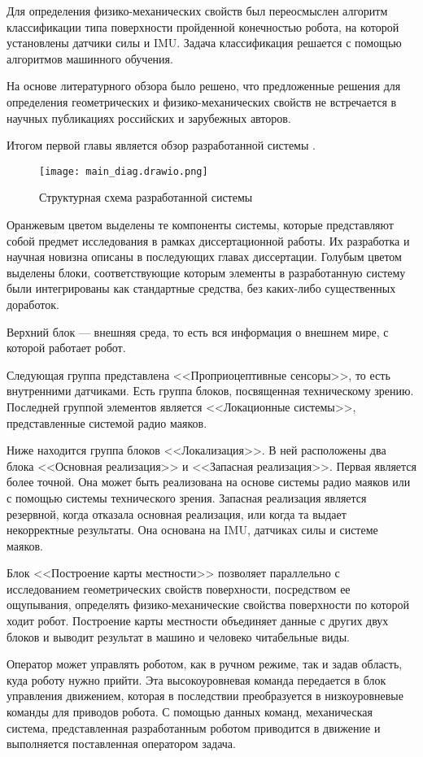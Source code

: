Для определения физико-механических свойств был переосмыслен алгоритм классификации типа поверхности пройденной конечностью робота, на которой установлены датчики силы и IMU. Задача классификация решается с помощью алгоритмов машинного обучения.  

На основе литературного обзора было решено, что предложенные решения для определения геометрических и физико-механических свойств не встречается в научных публикациях российских и зарубежных авторов.

Итогом первой главы является обзор разработанной системы .
\begin{figure}[ht!]
    \centering\texttt{[image: main\_diag.drawio.png]}
    \caption{Структурная схема разработанной системы}
    \label{fig:diag_system.png}
\end{figure}

Оранжевым цветом выделены те компоненты системы, которые представляют собой предмет исследования в рамках диссертационной работы. Их разработка и научная новизна описаны в последующих главах диссертации. Голубым цветом выделены блоки, соответствующие которым элементы в разработанную систему были интегрированы как стандартные средства,   без каких-либо существенных доработок.

Верхний блок --- внешняя среда, то есть вся информация о внешнем мире, с которой работает робот.

Следующая группа представлена <<Проприоцептивные сенсоры>>, то есть внутренними датчиками. Есть группа блоков, посвященная техническому зрению. Последней группой элементов является <<Локационные системы>>, представленные системой радио маяков. 

Ниже находится группа блоков <<Локализация>>. В ней расположены два блока <<Основная реализация>> и <<Запасная реализация>>. Первая является более точной. Она может быть реализована на основе системы радио маяков или с помощью системы технического зрения. Запасная реализация является резервной, когда отказала основная реализация, или когда та выдает некорректные результаты. Она основана на IMU, датчиках силы и системе маяков.

Блок <<Построение карты местности>> позволяет параллельно с исследованием геометрических свойств поверхности, посредством ее ощупывания, определять физико-механические свойства поверхности по которой ходит робот. Построение карты местности объединяет данные с других двух блоков и выводит результат в машино и человеко читабельные виды.

Оператор может управлять роботом, как в ручном режиме, так и задав область, куда роботу нужно прийти. Эта высокоуровневая команда передается в блок управления движением, которая в последствии преобразуется в низкоуровневые команды для приводов робота. С помощью данных команд, механическая система, представленная разработанным роботом приводится в движение и выполняется поставленная оператором задача.
